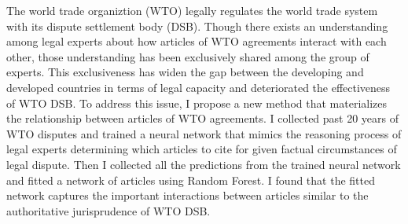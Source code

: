 The world trade organiztion (WTO) legally regulates the world trade system with its dispute settlement body (DSB).
Though there exists an understanding among legal experts about how articles of WTO agreements interact with each other, %
those understanding has been exclusively shared among the group of experts.  %
This exclusiveness has widen the gap
between the developing and developed countries in terms of
legal capacity and deteriorated the effectiveness of WTO DSB.
To address this issue, I propose a new method that materializes the relationship between articles of WTO agreements. %
I collected past 20 years of WTO disputes and trained a neural network that mimics the reasoning process of legal experts determining which articles to cite for given factual circumstances of legal dispute.
Then I collected all the predictions from the trained neural network and fitted a network of articles using Random Forest.
I found that the fitted network captures the important interactions between articles similar to the authoritative jurisprudence of WTO DSB.

















